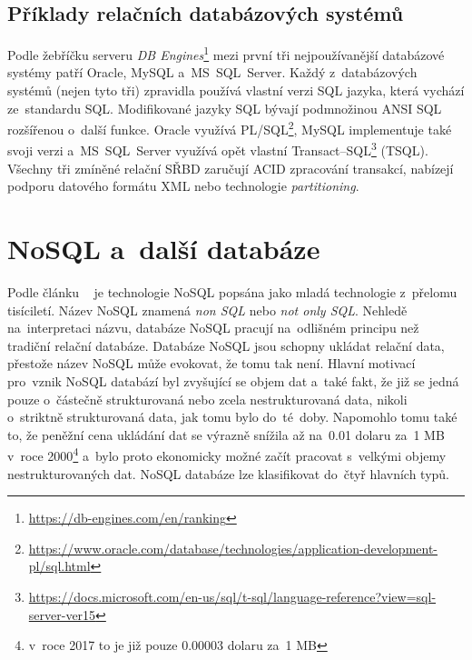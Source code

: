 \subsection{Příklady relačních databázových systémů}
\label{subsection:priklady_relacnich_databazovych_systemu}
Podle žebříčku serveru \textit{DB Engines}\footnote{\href{https://db-engines.com/en/ranking}{https://db-engines.com/en/ranking}} mezi první tři nejpoužívanější
databázové systémy patří Oracle, MySQL a~MS~SQL~Server. Každý z~databázových systémů (nejen tyto tři) zpravidla
používá vlastní verzi SQL jazyka, která vychází ze~standardu SQL. Modifikované jazyky SQL bývají podmnožinou ANSI
SQL rozšířenou o~další funkce. Oracle využívá PL/SQL\footnote{\href{https://www.oracle.com/database/technologies/application-development-pl/sql.html}{https://www.oracle.com/database/technologies/application-development-pl/sql.html}}, MySQL implementuje také
svoji verzi a~MS~SQL~Server využívá opět vlastní Transact--SQL\footnote{\href{https://docs.microsoft.com/en-us/sql/t-sql/language-reference?view=sql-server-ver15}{https://docs.microsoft.com/en-us/sql/t-sql/language-reference?view=sql-server-ver15}} (TSQL). Všechny tři zmíněné
relační SŘBD zaručují ACID zpracování transakcí, nabízejí podporu datového formátu XML nebo technologie \textit{partitioning}.
\vfill

\section{NoSQL a~další databáze}
\label{section:nosql_a_dalsi_databaze}
Podle článku ~\cite{NoSQLExplained} je technologie NoSQL popsána jako mladá technologie z~přelomu tisíciletí. Název NoSQL znamená \textit{non SQL} nebo \textit{not only SQL}. Nehledě na~interpretaci názvu, databáze
NoSQL pracují na~odlišném principu než tradiční relační databáze. Databáze NoSQL jsou schopny ukládat relační data,
přestože název NoSQL může evokovat, že tomu tak není.
Hlavní motivací pro~vznik NoSQL databází byl zvyšující se objem dat a~také fakt, že již se jedná pouze o~částečně
strukturovaná nebo zcela nestrukturovaná data, nikoli o~striktně strukturovaná data, jak tomu bylo do~té~doby.
Napomohlo tomu také to, že peněžní cena ukládání dat se výrazně snížila až na~0.01 dolaru za~1 MB v~roce 2000\footnote{v~roce 2017 to je již pouze 0.00003 dolaru za~1 MB} a~bylo proto ekonomicky možné začít pracovat s~velkými objemy nestrukturovaných dat. NoSQL databáze lze klasifikovat do~čtyř hlavních typů.

